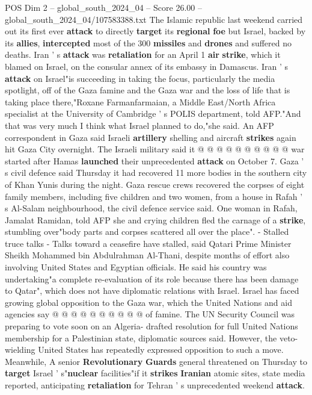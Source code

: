 \begin{textsample}{POS Dim 2 – global\_south\_2024\_04 – Score 26.00 – global\_south\_2024\_04/107583388.txt}
The Islamic republic last weekend carried out its first ever \textbf{attack} to directly \textbf{target} its \textbf{regional} \textbf{foe} but Israel, backed by its \textbf{allies}, \textbf{intercepted} most of the 300 \textbf{missiles} and \textbf{drones} and suffered no deaths.
Iran ' s \textbf{attack} was \textbf{retaliation} for an April 1 \textbf{air} \textbf{strike}, which it blamed on Israel, on the consular annex of its embassy in Damascus.
Iran ' s \textbf{attack} on Israel"is succeeding in taking the focus, particularly the media spotlight, off of the Gaza famine and the Gaza war and the loss of life that is taking place there,"Roxane Farmanfarmaian, a Middle East/North Africa specialist at the University of Cambridge ' s POLIS department, told AFP."And that was very much I think what Israel planned to do,"she said.
An AFP correspondent in Gaza said Israeli \textbf{artillery} shelling and aircraft \textbf{strikes} again hit Gaza City overnight.
The Israeli military said it @ @ @ @ @ @ @ @ @ @ war started after Hamas \textbf{launched} their unprecedented \textbf{attack} on October 7.
Gaza ' s civil defence said Thursday it had recovered 11 more bodies in the southern city of Khan Yunis during the night.
Gaza rescue crews recovered the corpses of eight family members, including five children and two women, from a house in Rafah ' s Al-Salam neighbourhood, the civil defence service said.
One woman in Rafah, Jamalat Ramidan, told AFP she and crying children fled the carnage of a \textbf{strike}, stumbling over"body parts and corpses scattered all over the place". - Stalled truce talks - Talks toward a ceasefire have stalled, said Qatari Prime Minister Sheikh Mohammed bin Abdulrahman Al-Thani, despite months of effort also involving United States and Egyptian officials.
He said his country was undertaking"a complete re-evaluation of its role because there has been damage to Qatar", which does not have diplomatic relations with Israel.
Israel has faced growing global opposition to the Gaza war, which the United Nations and aid agencies say @ @ @ @ @ @ @ @ @ @ of famine.
The UN Security Council was preparing to vote soon on an Algeria- drafted resolution for full United Nations membership for a Palestinian state, diplomatic sources said.
However, the veto-wielding United States has repeatedly expressed opposition to such a move.
Meanwhile, A senior \textbf{Revolutionary} \textbf{Guards} general threatened on Thursday to \textbf{target} Israel ' s"\textbf{nuclear} facilities"if it \textbf{strikes} \textbf{Iranian} atomic sites, state media reported, anticipating \textbf{retaliation} for Tehran ' s unprecedented weekend \textbf{attack}.

\end{textsample}
